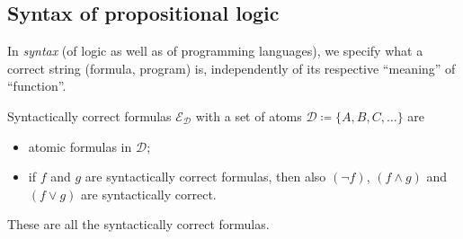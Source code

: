 \subsection{Syntax of propositional logic}
In \emph{syntax} (of logic as well as of programming languages), we specify what a correct string (formula, program) is, independently of its respective ``meaning'' of ``function''.
\begin{definition}[Syntax]\label{def:syntax_propositional_logic}
  Syntactically correct formulas \(\mathcal{E}_{\mathcal{D}}\) with a set of atoms \(\mathcal{D} \coloneqq \{A, B, C, \dots\}\) are
  \begin{itemize}
    \item atomic formulas in \(\mathcal{D}\);
    \item if \(f\) and \(g\) are syntactically correct formulas, then also \((\neg f)\), \((f \land g)\) and \((f \lor g)\) are syntactically correct.
  \end{itemize}
  These are all the syntactically correct formulas.
\end{definition}

